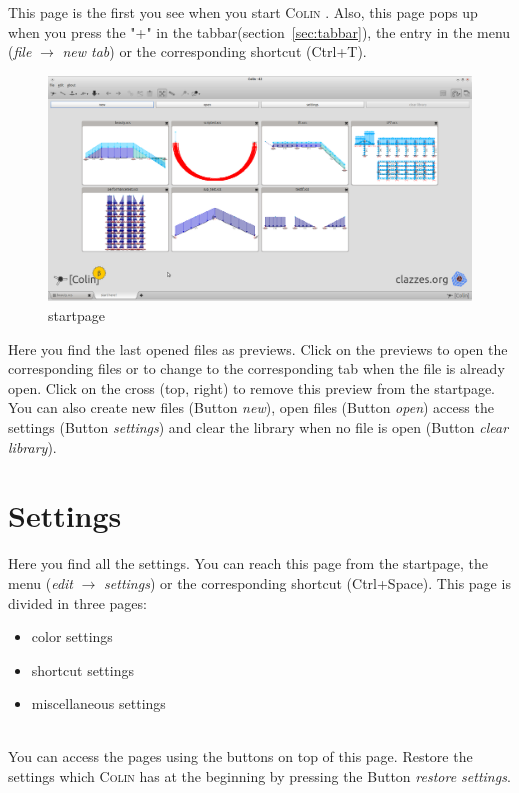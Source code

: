 \documentclass[a4paper,11pt]{report}
\newcommand{\Colin}[0]{\textsc{Colin }}
\begin{document}
This page is the first you see when you start \Colin. Also, this page pops up when you press the "+" in the tabbar(section~\ref{sec:tabbar}), the entry in the menu (\textit{file} $\rightarrow$ \textit{new tab}) or the corresponding shortcut (Ctrl+T). 
\begin{figure}[H]
\includegraphics[width=\textwidth]{../pictures/startpage.png}
\caption{startpage}
\label{pic:startpage}
\end{figure}
Here you find the last opened files as previews. Click on the previews to open the corresponding files or to change to the corresponding tab when the file is already open. Click on the cross (top, right) to remove this preview from the startpage. You can also create new files (Button \textit{new}), open files (Button \textit{open}) access the settings (Button \textit{settings}) and clear the library when no file is open (Button \textit{clear library}).

\section{Settings}
\label{sec:settings}
Here you find all the settings. You can reach this page from the startpage, the menu (\textit{edit} $\rightarrow$ \textit{settings}) or the corresponding shortcut (Ctrl+Space). This page is divided in three pages:
\begin{itemize}
	\item color settings
	\item shortcut settings
	\item miscellaneous settings
\end{itemize}\\
You can access the pages using the buttons on top of this page. Restore the settings which \Colin has at the beginning by pressing the Button \textit{restore settings}. 
\end{document}
